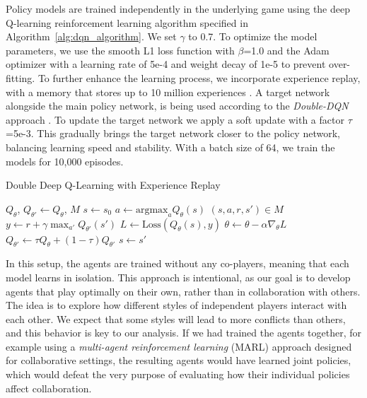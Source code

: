         \noindent
        Policy models are trained independently in the underlying game using the deep Q-learning reinforcement learning algorithm specified in Algorithm~\ref{alg:dqn_algorithm}. We set $\gamma$ to 0.7. To optimize the model parameters, we use the smooth L1 loss function with $\beta$=1.0 and the Adam optimizer with a learning rate of 5e-4 and weight decay of 1e-5 to prevent over-fitting. To further enhance the learning process, we incorporate experience replay, with a memory that stores up to 10 million experiences \cite{10.1007/BF00992699}. A target network alongside the main policy network, is being used according to the \emph{Double-DQN} approach \cite{vanhasselt2015deep}. To update the target network we apply a soft update with a factor $\tau$=5e-3. This gradually brings the target network closer to the policy network, balancing learning speed and stability. With a batch size of 64, we train the models for 10,000 episodes.
        \begin{algorithm}
            \caption{Double Deep Q-Learning with Experience Replay}
            \label{alg:dqn_algorithm}
            \begin{algorithmic}[1]
            \State $Q_\theta$, $Q_{\theta'} \gets Q_\theta$, $M$ 
                \State $s \gets s_{0}$
                    \State $a \gets \text{argmax}_a Q_\theta(s)$ 
                    \State $(s, a, r, s') \in M$ 
                         
                            \State $y \gets r + \gamma \max_{a'} Q_{\theta'}(s')$
                            \State $L \gets \text{Loss}(Q_\theta(s), y)$
                            \State $\theta \gets \theta - \alpha \nabla_\theta L$
                        \EndFor
                    \EndIf
                    \State $Q_{\theta'} \gets \tau Q_\theta + (1 - \tau) Q_{\theta'}$ 
                    \State $s \gets s'$
                \EndFor
            \EndFor
            \end{algorithmic}
        \end{algorithm}

        \noindent
        In this setup, the agents are trained without any co-players, meaning that each model learns in isolation. This approach is intentional, as our goal is to develop agents that play optimally on their own, rather than in collaboration with others. The idea is to explore how different styles of independent players interact with each other. We expect that some styles will lead to more conflicts than others, and this behavior is key to our analysis. If we had trained the agents together, for example using a \emph{multi-agent reinforcement learning} (MARL) approach designed for collaborative settings, the resulting agents would have learned joint policies, which would defeat the very purpose of evaluating how their individual  policies affect collaboration.\tinydouble

